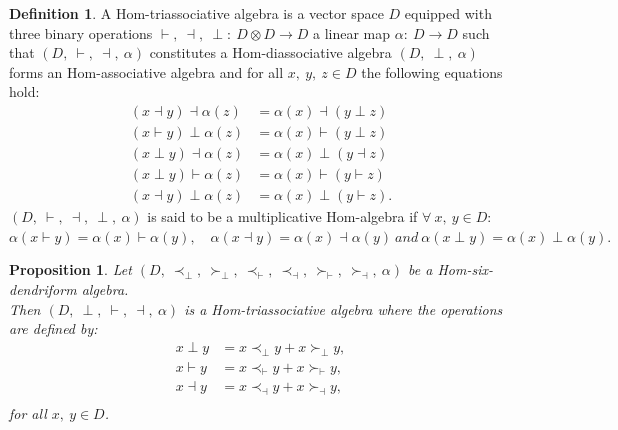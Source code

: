 \documentclass[11pt,twoside,reqno]{amsart}
\theoremstyle{plain}
\newtheorem{proposition}[thm]{Proposition}
\theoremstyle{definition}
\newtheorem{definition}[thm]{Definition}
\begin{document}
\begin{definition}\label{d16} 
A Hom-triassociative algebra is a vector space $D$ equipped with three binary operations
$
\vdash,\  \dashv ,\ \perp : \ D \otimes D \to D $ a linear map $\alpha : \ D \to D$ such that $(D,\  \vdash,\  \dashv,\  \alpha)$ constitutes a Hom-diassociative algebra  $(D,\  \perp,\  \alpha)$ forms an Hom-associative algebra  and for all $x,\ y,\  z \in D$  the following equations hold:
\begin{align}
(x \dashv y) \dashv \alpha(z)&= \alpha(x) \dashv (y \perp z)  \\
(x \vdash  y) \perp\alpha(z)&= \alpha(x) \vdash (y \perp z)  \\
(x \perp y) \dashv \alpha(z)& = \alpha(x) \perp (y \dashv z)  \\
(x \perp y) \vdash \alpha(z)&= \alpha(x) \vdash (y \vdash z)  \\
(x \dashv y) \perp \alpha(z)&= \alpha(x) \perp (y \vdash z).
\end{align}
 $(D ,\ \vdash,\  \dashv,\  \perp,\ \alpha)$ is said to be a multiplicative Hom-algebra if $\forall \ x,\ y \in D$:\\
$\alpha(x\vdash y)=\alpha(x)\vdash\alpha(y) ,\quad\alpha(x\dashv y)=\alpha(x)\dashv\alpha(y) \ and\ \alpha(x\perp y)=\alpha(x)\perp\alpha(y).$
\end{definition} 
\begin{proposition}
Let $(D ,\ \prec_\perp,\  \succ_\perp,\  \prec_\vdash,\  \prec_\dashv ,\ \succ_\vdash,\  \succ_\dashv ,\ \alpha)$ be a Hom-six-dendriform algebra.\\ Then $(D,\  \perp,\  \vdash,\  \dashv ,\ \alpha)$ is a Hom-triassociative algebra  where the operations are defined by:
\begin{align*}
x \perp y &= x \prec_\perp y + x \succ_\perp y ,\\
x \vdash y &= x \prec_\vdash y + x \succ_\vdash y ,\\
x \dashv y &= x \prec_\dashv y + x \succ_\dashv y ,\\
\end{align*}
for all $x,\ y \in D$.
\end{proposition}
\end{document}
